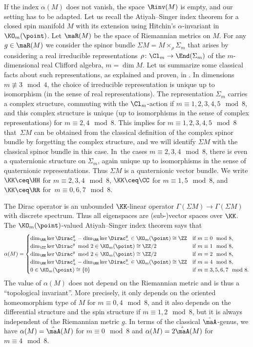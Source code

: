 If the index $\alpha(M)$ does not vanish, the space $\Rinv(M)$ is empty, and our setting has to be adapted. Let us recall the Atiyah--Singer index theorem for a closed spin manifold $M$ with its extension using Hitchin's $\alpha$-invariant in $\KO_m(\point)$. Let $\maR(M)$ be the space of Riemannian metrics on $M$.
For any $g\in \maR(M)$ we consider the spinor bundle $\Sigma M=M\times_\rho\Sigma_m$ that arises by considering a real irreducible representations $\rho\colon\Cl_m\to \End(\Sigma_m)$ of the $m$-dimensional real Clifford algebra, $m=\dim M$. Let us summarize some classical facts about such representations, as explained and proven, \eg in \cite[Theorem~I.5.8]{lawson.michelsohn:89}. In dimensions $m\not\equiv 3 \mod 4$, the choice of irreducible representation is unique up to isomorphism (in the sense of real representations).
The representation $\Sigma_m$ carries a complex structure, commuting with the $\Cl_m$-action if ${m\equiv 1,2,3,4,5\mod 8}$, and this complex structure is unique (up to isomorphisms in the sense of complex representations) for $m\equiv 2,4\mod 8$. This implies for $m\equiv 1,2,3,4,5\mod 8$ that~$\Sigma M$ can be obtained from the classical definition of the complex spinor bundle by forgetting the complex structure, and we will identify $\Sigma M$ with the classical spinor bundle in this case. In~the cases $m\equiv 2,3,4\mod 8$, there is even a quaternionic structure on $\Sigma_m$, again unique up to isomorphisms in the sense of quaternionic representations. Thus $\Sigma M$ is a quaternionic vector bundle. We write $\KK\ceq \HH$ for $m\equiv 2,3,4\mod 8$, $\KK\ceq \CC$ for $m\equiv 1,5\mod 8$, and $\KK\ceq \RR$ for~${m\equiv 0,6,7\mod 8}$.

The Dirac operator  is an unbounded $\KK$-linear operator $\Gamma(\Sigma M)\to \Gamma(\Sigma M)$ with discrete spectrum. Thus all eigenspaces are (sub-)vector spaces over $\KK$.
The $\KO_m(\point)$-valued Atiyah--Singer index theorem says that
\[\alpha(M) =
 \begin{cases}
 \dim_\RR \ker\Dirac^g_+ -\dim_\RR \ker\Dirac^g_-\in \KO_m(\point)\cong \ZZ & \text{if}\ m\equiv0\mod 8,\\
 \dim_\CC \ker\Dirac^g\!\mod 2\in \KO_m(\point)\cong \ZZ/2 & \text{if}\ m\equiv 1\mod 8,\\
 \dim_\HH \ker\Dirac^g\!\mod 2\in \KO_m(\point)\cong \ZZ/2 & \text{if}\ m\equiv 2\mod 8,\\
 \dim_\HH \ker\Dirac^g_+ -\dim_\HH \ker\Dirac^g_-\in \KO_m(\point)\cong \ZZ & \text{if}\ m\equiv 4\mod 8,\\
 0\in \KO_m(\point)\cong \{0\} & \text{if}\ m\equiv 3,5,6,7\mod 8.
 \end{cases}
\]
The value of $\alpha(M)$ does not depend on the Riemannian metric and is thus a ``topological invariant''. More precisely, it only depends on the oriented homeomorphism type of $M$ for ${m\equiv 0,4 \mod 8}$, and it also depends on the differential structure and the spin structure if ${m\equiv 1,2\mod 8}$, but it is always independent of the Riemannian metric $g$.
In terms of the classical $\hat\maA$-genus, we have $\alpha(M)=\hat\maA(M)$ for $m\equiv 0\mod 8$ and $\alpha(M)=2\hat\maA(M)$ for $m\equiv 4\mod 8$.

